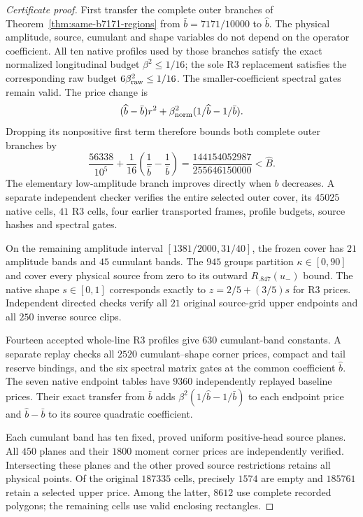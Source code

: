 \documentclass{article}
\begin{document}
\begin{proof}[Certificate proof]
First transfer the complete outer branches of
Theorem~\ref{thm:same-b7171-regions} from $\bar b=7171/10000$ to
$\widehat b$. The physical amplitude, source, cumulant and shape variables
do not depend on the operator coefficient. All ten native profiles used
by those branches satisfy the exact normalized longitudinal budget
$\beta^2\le1/16$; the sole R3 replacement satisfies the corresponding
raw budget $6\beta_{\rm raw}^2\le1/16$. The smaller-coefficient spectral
gates remain valid. The price change is
\[
 (\widehat b-\bar b)r^2+
 \beta_{\rm norm}^2(1/\widehat b-1/\bar b).
\]
Dropping its nonpositive first term therefore bounds both complete outer
branches by
\[
 \frac{56338}{10^5}+\frac1{16}
   \left(\frac1{\widehat b}-\frac1{\bar b}\right)
 =\frac{144154052987}{255646150000}
 <\widehat B.
\]
The elementary low-amplitude branch improves directly when $b$ decreases.
A separate independent checker verifies the entire selected outer cover,
its $45025$ native cells, $41$ R3 cells, four earlier transported frames,
profile budgets, source hashes and spectral gates.

On the remaining amplitude interval $[1381/2000,31/40]$, the frozen
cover has $21$ amplitude bands and $45$ cumulant bands. The $945$ groups
partition $\kappa\in[0,90]$ and cover every physical source from zero
to its outward $R_{.847}(u_-)$ bound. The native shape $s\in[0,1]$
corresponds exactly to $z=2/5+(3/5)s$ for R3 prices. Independent directed
checks verify all $21$ original source-grid upper endpoints and all
$250$ inverse source clips.

Fourteen accepted whole-line R3 profiles give $630$ cumulant-band
constants. A separate replay checks all $2520$ cumulant--shape corner
prices, compact and tail reserve bindings, and the six spectral matrix
gates at the common coefficient $\widehat b$. The seven native endpoint
tables have $9360$ independently replayed baseline prices. Their exact
transfer from $\bar b$ adds
$\beta^2(1/\widehat b-1/\bar b)$ to each endpoint price and
$\widehat b-\bar b$ to its source quadratic coefficient.

Each cumulant band has ten fixed, proved uniform positive-head source
planes. All $450$ planes and their $1800$ moment corner prices are
independently verified. Intersecting these planes and the other proved
source restrictions retains all physical points. Of the original
$187335$ cells, precisely $1574$ are empty and $185761$ retain a selected
upper price. Among the latter, $8612$ use complete recorded polygons;
the remaining cells use valid enclosing rectangles.


\end{proof}
\end{document}
